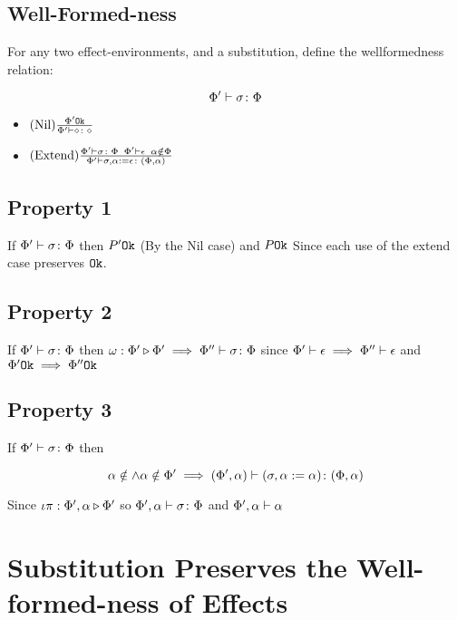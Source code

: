 {    \subsection{Well-Formed-ness }

    For any two effect-environments, and a substitution, define the wellformedness relation:

    \begin{equation}
        \Phi' \vdash \sigma \colon \Phi
    \end{equation}

    \begin{itemize}
        \item $(\text{Nil}) \frac{\Phi' \texttt{Ok}}{\Phi' \vdash \diamond \colon \diamond}$
        \item $(\text{Extend}) \frac{\Phi' \vdash \sigma \colon \Phi\;\;\Phi'\vdash \epsilon\;\;\alpha\notin\Phi}{\Phi' \vdash \sigma, \alpha :=\epsilon \colon (\Phi, \alpha)}$
    \end{itemize}

    \subsection{Property 1}
    If $\Phi' \vdash \sigma \colon \Phi$ then $P' \texttt{Ok}$ (By  the 
    Nil case) and $P \texttt{Ok}$ Since each use of the extend case preserves $\texttt{Ok}$.

    \subsection{Property 2}
    If $\Phi' \vdash \sigma \colon \Phi$ then $\omega : \Phi' \triangleright \Phi' \implies \Phi'' \vdash \sigma \colon \Phi$ since $\Phi'\vdash \epsilon\implies \Phi''\vdash \epsilon$ and $\Phi' \texttt{Ok}\implies \Phi'' \texttt{Ok}$


    \subsection{Property 3}
    If $\Phi' \vdash \sigma \colon \Phi$ then

    \begin{equation}
        \alpha\notin\wedge\alpha\notin\Phi' \implies (\Phi', \alpha) \vdash (\sigma, \alpha:=\alpha) \colon (\Phi,\alpha)
    \end{equation}

    Since $\iota\pi : \Phi',\alpha \triangleright \Phi'$ so $\Phi',\alpha \vdash \sigma \colon \Phi$ and $\Phi',\alpha\vdash \alpha$

    \section{Substitution Preserves the Well-formed-ness of Effects}

}
